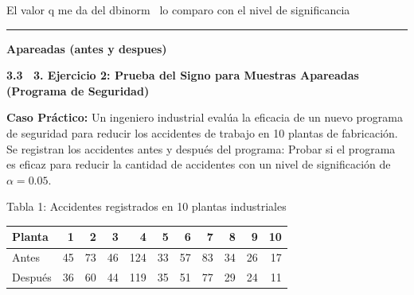 \documentclass[10pt,a4paper]{article}
\begin{document}
El valor q me da del dbinorm \ lo comparo con el nivel de significancia

\hrule
\vspace{2pt}

\begin{center}\textbf{Apareadas (antes y despues)}\end{center}
\vspace{-4pt}

\textbf{3.3 \ 3. Ejercicio 2: Prueba del Signo para Muestras Apareadas (Programa de Seguridad)}

\textbf{Caso Práctico:} Un ingeniero industrial evalúa la eficacia de un nuevo programa de seguridad para reducir los accidentes de trabajo en 10 plantas de fabricación. Se registran los accidentes antes y después del programa: Probar si el programa es eficaz para reducir la cantidad de accidentes con un nivel de significación de $\alpha = 0.05$.

\begin{center}
\vspace{-4pt}
{\small Tabla 1: Accidentes registrados en 10 plantas industriales}

\vspace{1pt}
{\small
\begin{tabular}{l r r r r r r r r r r}
\toprule
Planta & 1 & 2 & 3 & 4 & 5 & 6 & 7 & 8 & 9 & 10 \\
\midrule
Antes & 45 & 73 & 46 & 124 & 33 & 57 & 83 & 34 & 26 & 17 \\
Después & 36 & 60 & 44 & 119 & 35 & 51 & 77 & 29 & 24 & 11 \\
\bottomrule
\end{tabular}
}
\vspace{-6pt}
\end{center}
\end{document}
